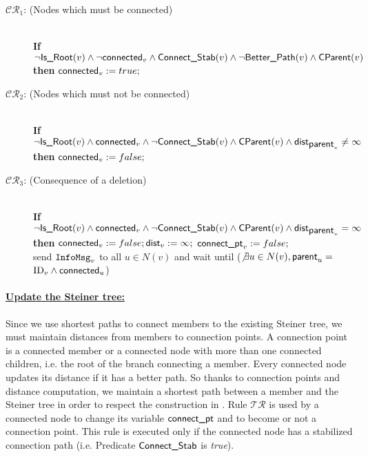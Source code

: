 \documentclass[11pt]{article}
\newcommand{\id}{\mbox{ID}}
\newcommand{\InfoMsg}{\mbox{\tt InfoMsg}}
\newcommand{\parent}{\mbox{\sf parent}}
\newcommand{\dist}{\mbox{\sf dist}}
\newcommand{\connect}{\mbox{\sf connected}}
\newcommand{\connectpt}{\mbox{\sf connect\_pt}}
\newcommand{\IsRoot}{\mbox{\sf Is\_Root}}
\newcommand{\CParent}{\mbox{\sf CParent}}
\newcommand{\Better}{\mbox{\sf Better\_Path}}
\newcommand{\ConnectS}{\mbox{\sf Connect\_Stab}}
\newcommand{\CRD}{$\mathcal{CR}_1$}
\newcommand{\CRE}{$\mathcal{CR}_2$}
\newcommand{\CRF}{$\mathcal{TR}$}
\newcommand{\CRG}{$\mathcal{CR}_3$}
\begin{document}
\begin{small}
\begin{description}
\item[\CRD: (Nodes which must be connected)]~\\\textbf{If} $\neg \IsRoot(v) \wedge \neg \connect_v \wedge \ConnectS(v) \wedge \neg \Better(v) \wedge \CParent(v)$\\
\textbf{then} $\connect_v:=true;$
\item[\CRE: (Nodes which must not be connected)]~\\\textbf{If} $\neg \IsRoot(v) \wedge \connect_v \wedge \neg \ConnectS(v) \wedge \CParent(v) \wedge \dist_{\parent_v}\neq \infty$ 
\textbf{then} $\connect_v:=false;$
\item[\CRG: (Consequence of a deletion)]~\\
\textbf{If} $\neg \IsRoot(v) \wedge \connect_v \wedge \neg \ConnectS(v) \wedge \CParent(v) \wedge \dist_{\parent_v}= \infty $
\textbf{then} $\connect_v:=false; \dist_v:=\infty;$ $\connectpt_v:=false; $\\
\hspace*{1,1cm} send $\InfoMsg_v$ to all $u \in N(v)$ and wait until ($\not \exists u\in N(v), \parent_u=$\\ \hspace*{1,2cm}$\id_v \wedge \connect_u$)



\end{description}
\end{small}
\paragraph{\underline{Update the Steiner tree:}}

Since we use shortest paths to connect members to the existing Steiner
tree, we must maintain distances from members to 
connection points. A connection point is a connected member or a connected node with more than one connected children, i.e. the root of the branch connecting a member. Every connected node updates its distance if it has a better path. So thanks to connection points and distance computation, we maintain a shortest path between a member and the Steiner tree in order to respect the construction in \cite{ImaseWaxman91}. Rule \CRF\/ is used by a connected node to change its variable $\connectpt$ and to become or not a connection point. This rule is executed only if the connected node has a stabilized connection path (i.e. Predicate $\ConnectS$ is \emph{true}).
\end{document}

